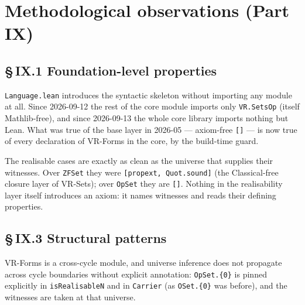 \section{Methodological observations (Part IX)}
\label{sec:forms_method}

\subsection*{\S\,IX.1 Foundation-level properties}

\begin{remark}
\label{rem:obs1_import}
\leanok
{}
\texttt{Language.lean} introduces the syntactic skeleton without importing
any module at all.  Since 2026-09-12 the rest of the core module imports
only \texttt{VR.SetsOp} (itself Mathlib-free), and since 2026-09-13 the
whole core library imports nothing but Lean.  What was true of the base
layer in 2026-05 --- axiom-free \texttt{[]} --- is now true of every
declaration of VR-Forms in the core, by the build-time guard.
\end{remark}

\begin{remark}
\label{rem:obs2_classical}
\leanok
{}
The realisable cases are exactly as clean as the universe that supplies
their witnesses.  Over \texttt{ZFSet} they were \texttt{[propext,
Quot.sound]} (the Classical-free closure layer of VR-Sets); over
\texttt{OpSet} they are \texttt{[]}.  Nothing in the realisability layer
itself introduces an axiom: it names witnesses and reads their defining
properties.
\end{remark}

\subsection*{\S\,IX.3 Structural patterns}

\begin{remark}
\label{rem:obs8_universe}
\leanok
{}
VR-Forms is a cross-cycle module, and universe inference does not
propagate across cycle boundaries without explicit annotation:
\texttt{OpSet.\{0\}} is pinned explicitly in \texttt{isRealisableN} and in
\texttt{Carrier} (as \texttt{OSet.\{0\}} was before), and the witnesses are
taken at that universe.
\end{remark}

